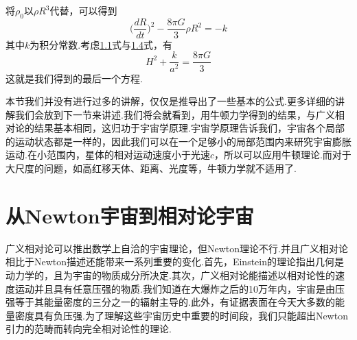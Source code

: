 \documentclass[a4paper]{book}
\begin{document}
将$\rho_0$以$\rho R^3$代替，可以得到
\begin{equation}
\Big(\frac{dR}{dt}\Big)^2-\frac{8\pi G}{3}\rho R^2=-k
\end{equation}
其中$k$为积分常数.考虑\hyperref[1.1]{1.1}式与\hyperref[1.4]{1.4}式，有
\begin{equation}
	H^2+\frac{k}{a^2}=\frac{8\pi G}{3}
\end{equation}
这就是我们得到的最后一个方程.\par 
本节我们并没有进行过多的讲解，仅仅是推导出了一些基本的公式.更多详细的讲解我们会放到下一节来讲述.我们将会就看到，用牛顿力学得到的结果，与广义相对论的结果基本相同，这归功于宇宙学原理.宇宙学原理告诉我们，宇宙各个局部的运动状态都是一样的，因此我们可以在一个足够小的局部范围内来研究宇宙膨胀运动.在小范围内，星体的相对运动速度小于光速$c$，所以可以应用牛顿理论.而对于大尺度的问题，如高红移天体、距离、光度等，牛顿力学就不适用了.
\section{从Newton宇宙到相对论宇宙}
广义相对论可以推出数学上自洽的宇宙理论，但Newton理论不行.并且广义相对论相比于Newton描述还能带来一系列重要的变化.首先，Einstein的理论指出几何是动力学的，且为宇宙的物质成分所决定.其次，广义相对论能描述以相对论性的速度运动并且具有任意压强的物质.我们知道在大爆炸之后的10万年内，宇宙是由压强等于其能量密度的三分之一的辐射主导的.此外，有证据表面在今天大多数的能量密度具有负压强.为了理解这些宇宙历史中重要的时间段，我们只能超出Newton引力的范畴而转向完全相对论性的理论.
\end{document}
